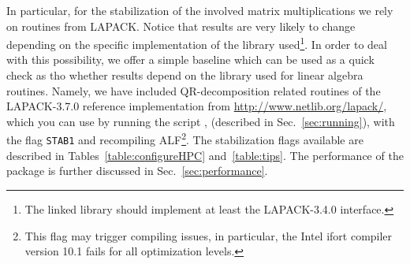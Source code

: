 In particular, for the stabilization of the involved matrix multiplications we rely on routines from LAPACK. Notice that results are very likely to change
depending on the specific implementation of the library used\footnote{The linked library should implement at least the LAPACK-3.4.0 interface.}. In order to deal with this possibility, we offer a simple baseline which can be used as a quick check as tho whether results depend on the library used for linear algebra routines. Namely, we have included QR-decomposition related routines of the LAPACK-3.7.0 reference implementation from \url{http://www.netlib.org/lapack/}, which you can use by running the script , (described in Sec.~\ref{sec:running}), with the flag \texttt{STAB1} and recompiling ALF\footnote{This flag may trigger compiling issues, in particular, the Intel ifort compiler version 10.1 fails for all optimization levels.}. The stabilization flags available are described in Tables~\ref{table:configureHPC} and~\ref{table:tips}. The performance of the package is further discussed in Sec.~\ref{sec:performance}.


